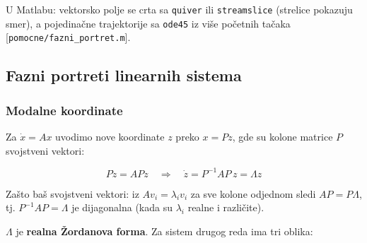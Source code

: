 \documentclass[11pt,a4paper,parskip=half,headsepline,numbers=noenddot]{scrartcl}
\DeclareRobustCommand{\izvor}[1]{{\small\color{izvorC}[#1]}}
\begin{document}
U Matlabu: vektorsko polje se crta sa \texttt{quiver} ili \texttt{streamslice} (strelice pokazuju smer), a pojedinačne trajektorije sa \texttt{ode45} iz više početnih tačaka \izvor{\texttt{pomocne/\allowbreak{}fazni\_\allowbreak{}portret.m}}.

\subsection{Fazni portreti linearnih sistema}

\subsubsection{Modalne koordinate}

Za \(\dot x = Ax\) uvodimo nove koordinate \(z\) preko \(x = Pz\), gde su kolone matrice \(P\) svojstveni vektori:

\[P\dot z = APz \quad\Rightarrow\quad \dot z = P^{-1}AP\,z = \Lambda z\]

Zašto baš svojstveni vektori: iz \(Av_i = \lambda_iv_i\) za sve kolone odjednom sledi \(AP = P\Lambda\), tj. \(P^{-1}AP = \Lambda\) je dijagonalna (kada su \(\lambda_i\) realne i različite).

\(\Lambda\) je \textbf{realna Žordanova forma}. Za sistem drugog reda ima tri oblika:
\end{document}
